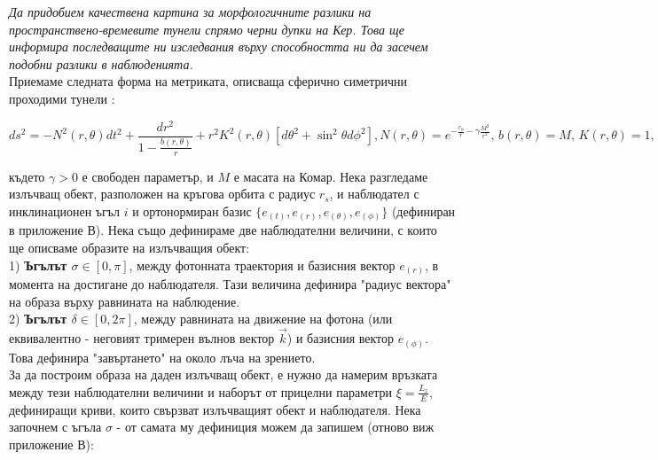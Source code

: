 \documentclass[12pt]{article}
\numberwithin{equation}{section}
\numberwithin{figure}{section}
\begin{document}
	\noindent\emph{Да придобием качествена картина за морфологичните разлики на пространствено-времевите тунели спрямо черни дупки на Кер. Това ще информира последващите ни изследвания върху способността ни да засечем подобни разлики в наблюденията.}\\
	
	\noindent Приемаме следната форма на метриката, описваща сферично симетрични проходими тунели \cite{Morris1988}:
	
	\begin{subequations}
		\begin{equation}
			ds^2 = -N^2(r,\theta)dt^2 + \frac{dr^2}{1 - \frac{b(r,\theta)}{r}} + r^2K^2(r,\theta)\left[d\theta^2 + \sin^2\theta d\phi^2\right],
		\end{equation}
		\begin{equation}
			N(r,\theta) = e^{-\frac{r_0}{r} - \gamma\frac{M^2}{r^2}},\, b(r,\theta) = M,\, K(r,\theta) = 1,
		\end{equation}	
	\end{subequations}
	
	\noindent където $\gamma > 0$ е свободен параметър, и $M$ е масата на Комар. Нека разгледаме излъчващ обект, разположен на кръгова орбита с радиус $r_s$, и наблюдател с инклинационен ъгъл $i$ и ортонормиран базис $\{e_{(t)}, e_{(r)}, e_{(\theta)}, e_{(\phi)}\}$ (дефиниран в приложение В). Нека също дефинираме две наблюдателни величини, с които ще описваме образите на излъчващия обект:\\
	
	1) \textbf{Ъгълът $\sigma\in[0,\pi]$}, между фотонната траектория и базисния вектор $e_{(r)}$, в момента на достигане до наблюдателя. Тази величина дефинира "радиус вектора" на образа върху равнината на наблюдение.\\
	
	2) \textbf{Ъгълът $\delta\in[0,2\pi]$}, между равнината на движение на фотона (или еквивалентно - неговият тримерен вълнов вектор $\vec{k}$) и базисния вектор $e_{(\phi)}$. Това дефинира "завъртането" на около лъча на зрението.\\
	
	За да построим образа на даден излъчващ обект, е нужно да намерим връзката между тези наблюдателни величини и наборът от прицелни параметри $\xi = \frac{L_z}{E}$, дефиниращи криви, които свързват излъчващият обект и наблюдателя. Нека започнем с ъгъла $\sigma$ - от самата му дефиниция можем да запишем (отново виж приложение В):
	
\end{document}
